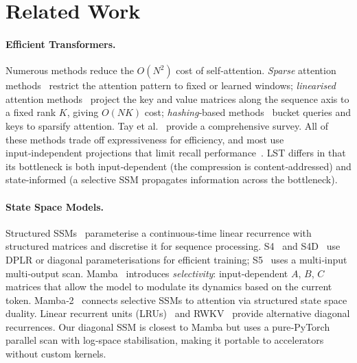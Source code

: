 \documentclass[10pt,twocolumn,letterpaper]{article}
\newcommand{\LST}{\textsc{LST}}
\begin{document}
\section{Related Work}
\label{sec:related}

\paragraph{Efficient Transformers.}  Numerous methods reduce the $O(N^2)$ cost of self‑attention.  \emph{Sparse} attention methods~\cite{beltagy2020longformer,zaheer2020big} restrict the attention pattern to fixed or learned windows; \emph{linearised} attention methods~\cite{wang2020linformer,choromanski2020rethinking,katharopoulos2020transformers,yang2024gated} project the key and value matrices along the sequence axis to a fixed rank $K$, giving $O(NK)$ cost; \emph{hashing}‑based methods~\cite{kitaev2020reformer} bucket queries and keys to sparsify attention.  Tay et al.~\cite{tay2022efficient} provide a comprehensive survey.  All of these methods trade off expressiveness for efficiency, and most use input‑independent projections that limit recall performance~\cite{arora2023simple}.  \LST{} differs in that its bottleneck is both input‑dependent (the compression is content‑addressed) and state‑informed (a selective SSM propagates information across the bottleneck).

\paragraph{State Space Models.}  Structured SSMs~\cite{gu2022efficiently,gu2021combining} parameterise a continuous‑time linear recurrence with structured matrices and discretise it for sequence processing.  S4~\cite{gu2022efficiently} and S4D~\cite{gupta2022diagonal} use DPLR or diagonal parameterisations for efficient training; S5~\cite{smith2023simplified} uses a multi‑input multi‑output scan.  Mamba~\cite{gu2023mamba} introduces \emph{selectivity}: input‑dependent $A$, $B$, $C$ matrices that allow the model to modulate its dynamics based on the current token.  Mamba‑2~\cite{dao2024transformers} connects selective SSMs to attention via structured state space duality.  Linear recurrent units (LRUs)~\cite{orvieto2023resurrecting} and RWKV~\cite{peng2023rwkv} provide alternative diagonal recurrences.  Our diagonal SSM is closest to Mamba but uses a pure‑PyTorch parallel scan with log‑space stabilisation, making it portable to accelerators without custom kernels.
\end{document}
